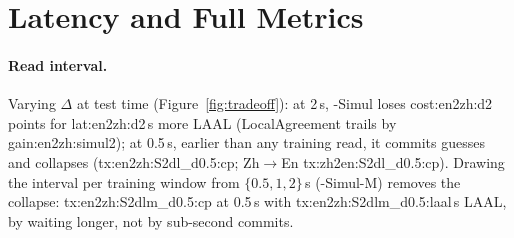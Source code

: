\begin{table}[h]
\centering\small
\setlength{\tabcolsep}{3pt}
\caption{Training hyperparameters (\sys{}-Simul: En$\rightarrow$Zh / Zh$\rightarrow$En).}
\label{tab:hyper}
\end{table}

\section{Latency and Full Metrics}
\label{app:full}





\paragraph{Read interval.} Varying $\Delta$ at test time (Figure~\ref{fig:tradeoff}): at 2\,s, \sys{}-Simul loses
\num{cost:en2zh:d2} points for \num{lat:en2zh:d2}\,s more LAAL (LocalAgreement trails by \num{gain:en2zh:simul2}); at
0.5\,s, earlier than any training read, it commits guesses and collapses (\num{tx:en2zh:S2dl_d0.5:cp};
Zh$\rightarrow$En \num{tx:zh2en:S2dl_d0.5:cp}). Drawing the
interval per training window from $\{0.5,1,2\}$\,s (\sys{}-Simul-M) removes the collapse: \num{tx:en2zh:S2dlm_d0.5:cp}
at 0.5\,s with \num{tx:en2zh:S2dlm_d0.5:laal}\,s LAAL, by waiting longer, not by sub-second commits.


